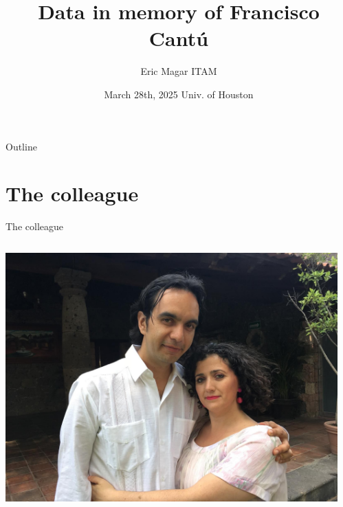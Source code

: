 \documentclass[bigger]{beamer}
\author{Eric Magar \newline ITAM}
\date{March 28th, 2025 \newline Univ. of Houston}
\title{Data in memory of Francisco Cantú}
\begin{document}
\maketitle
\begin{frame}{Outline}
\tableofcontents
\end{frame}


\section{The colleague}
\label{sec:orgfd74d73}
\begin{frame}[label={sec:org1673f13}]{The colleague}
\begin{columns}
\begin{column}{0.5\columnwidth}
\includegraphics[width=\textwidth]{../../cantu-pics/cantu-y-lucero.jpeg}
\end{column}
\begin{column}{0.5\columnwidth}

\end{column}
\end{columns}
\end{frame}
\end{document}
